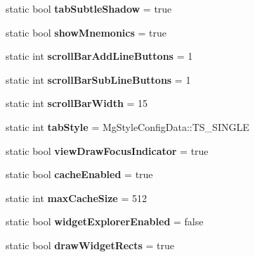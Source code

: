 \begin{DoxyCompactItemize}
static bool {\bfseries tab\+Subtle\+Shadow} = true
\item 
\mbox{\label{struct_mg_style_config_data_a3258ef68f3c85121401241be8fff8fd0}} 
static bool {\bfseries show\+Mnemonics} = true
\item 
\mbox{\label{struct_mg_style_config_data_af2ca8ab9571806a67745c13874bf99e2}} 
static int {\bfseries scroll\+Bar\+Add\+Line\+Buttons} = 1
\item 
\mbox{\label{struct_mg_style_config_data_a8335a7c7a727428d80fe1e0d6b0500da}} 
static int {\bfseries scroll\+Bar\+Sub\+Line\+Buttons} = 1
\item 
\mbox{\label{struct_mg_style_config_data_ad27f1e3d887b63f6639c3565b956f62b}} 
static int {\bfseries scroll\+Bar\+Width} = 15
\item 
\mbox{\label{struct_mg_style_config_data_afeec1283daac7d1cbf05dc3151d77551}} 
static int {\bfseries tab\+Style} = Mg\+Style\+Config\+Data\+::\+T\+S\+\_\+\+S\+I\+N\+G\+LE
\item 
\mbox{\label{struct_mg_style_config_data_a7fb2415cbe8aa9822b0535e9d52b131e}} 
static bool {\bfseries view\+Draw\+Focus\+Indicator} = true
\item 
\mbox{\label{struct_mg_style_config_data_a320a9d401d39aad2d1dc1ce649d660e3}} 
static bool {\bfseries cache\+Enabled} = true
\item 
\mbox{\label{struct_mg_style_config_data_a2727f39ee83a8a998d0bbd7c43bfa446}} 
static int {\bfseries max\+Cache\+Size} = 512
\item 
\mbox{\label{struct_mg_style_config_data_a25c5bd94f9ea965f0a5c1d8c22b1fdc4}} 
static bool {\bfseries widget\+Explorer\+Enabled} = false
\item 
\mbox{\label{struct_mg_style_config_data_a118631ce9c8a927e1c5adcf873f05284}} 
static bool {\bfseries draw\+Widget\+Rects} = true

\end{DoxyCompactItemize}
